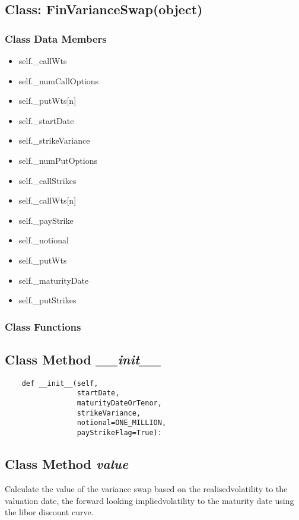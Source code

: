 \documentclass[twoside,11pt]{book}
\begin{document}
\subsection{Class: FinVarianceSwap(object)}


\subsubsection{Class Data Members}
\begin{itemize}
\item{self.\_callWts}
\item{self.\_numCallOptions}
\item{self.\_putWts[n]}
\item{self.\_startDate}
\item{self.\_strikeVariance}
\item{self.\_numPutOptions}
\item{self.\_callStrikes}
\item{self.\_callWts[n]}
\item{self.\_payStrike}
\item{self.\_notional}
\item{self.\_putWts}
\item{self.\_maturityDate}
\item{self.\_putStrikes}
\end{itemize}

\subsubsection{Class Functions}

\subsection{Class Method {\it \_\_init\_\_}}


\begin{lstlisting}
    def __init__(self,
                 startDate,
                 maturityDateOrTenor,
                 strikeVariance,
                 notional=ONE_MILLION,
                 payStrikeFlag=True):
\end{lstlisting}

\subsection{Class Method {\it value}}
Calculate the value of the variance swap based on the realisedvolatility to the valuation date, the forward looking impliedvolatility to the maturity date using the libor discount curve. 
\end{document}
